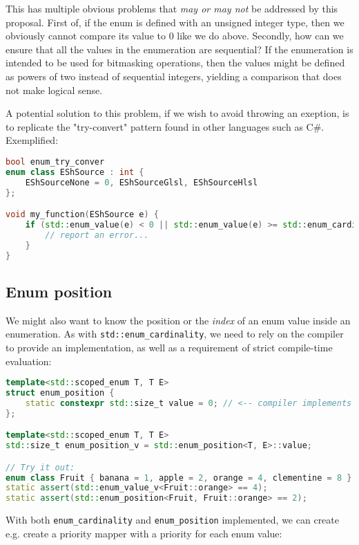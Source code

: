 \documentclass[
  format=manuscript,
  screen=true,
  review=false,
  nonacm=true,
  timestamp=true,
  balance=false]{acmart}
\begin{document}
\noindent
This has multiple obvious problems that \textit{may or may not} be addressed by
this proposal. First of, if the enum is defined with an unsigned integer type, then
we obviously cannot compare its value to 0 like we do above. Secondly, how can we
ensure that all the values in the enumeration are sequential? If the enumeration is
intended to be used for bitmasking operations, then the values might be defined as
powers of two instead of sequential integers, yielding a comparison that does not
make logical sense.

A potential solution to this problem, if we wish to avoid throwing an exeption, is
to replicate the "try-convert" pattern found in other languages such as C\#.
Exemplified:\vspace{2mm}

\begin{lstlisting}[language=Cpp]
bool enum_try_conver
enum class EShSource : int {
    EShSourceNone = 0, EShSourceGlsl, EShSourceHlsl
};

void my_function(EShSource e) {
    if (std::enum_value(e) < 0 || std::enum_value(e) >= std::enum_cardinality_v<EShSource>) {
        // report an error...
    }
}
\end{lstlisting}


\subsection{Enum position}

We might also want to know the position or the \textit{index} of an enum value
inside an enumeration. As with \texttt{std::enum\_cardinality}, we need to rely
on the compiler to provide an implementation, as well as a requirement of strict
compile-time evaluation:\vspace{2mm}

\begin{lstlisting}[language=Cpp]
template<std::scoped_enum T, T E>
struct enum_position {
    static constexpr std::size_t value = 0; // <-- compiler implements this
};

template<std::scoped_enum T, T E>
std::size_t enum_position_v = std::enum_position<T, E>::value;

// Try it out:
enum class Fruit { banana = 1, apple = 2, orange = 4, clementine = 8 };
static assert(std::enum_value_v<Fruit::orange> == 4);
static assert(std::enum_position<Fruit, Fruit::orange> == 2);
\end{lstlisting}

\noindent
With both \texttt{enum\_cardinality} and \texttt{enum\_position} implemented, we
can create e.g. create a priority mapper with a priority for each enum value:\vspace{2mm}
\end{document}
